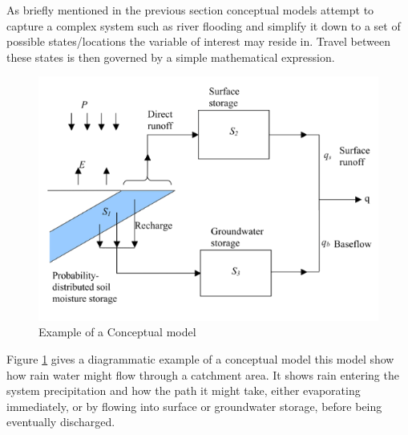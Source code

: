 \documentclass[11pt]{article}
\begin{document}
 As briefly mentioned in the previous section conceptual models attempt to capture a complex system such as river flooding and simplify it down to a set of possible states/locations the variable of interest may reside in. Travel between these states is then governed by a simple mathematical expression.
 
 \begin{minipage}{0.5\textwidth}
    \begin{figure}[H]
        \centering
        \includegraphics[width=1\textwidth]{Figs/Concept.png}
        \caption{Example of a Conceptual model}
        \label{fig:conceptual}
    \end{figure}
\end{minipage}
\begin{minipage}{0.4\textwidth}
    Figure \ref{fig:conceptual} gives a diagrammatic example of a conceptual model this model show how rain water might flow through a catchment area. It shows rain entering the system precipitation and how the path it might take, either evaporating immediately, or by flowing into surface or groundwater storage, before being eventually discharged.
\end{minipage}
\end{document}
